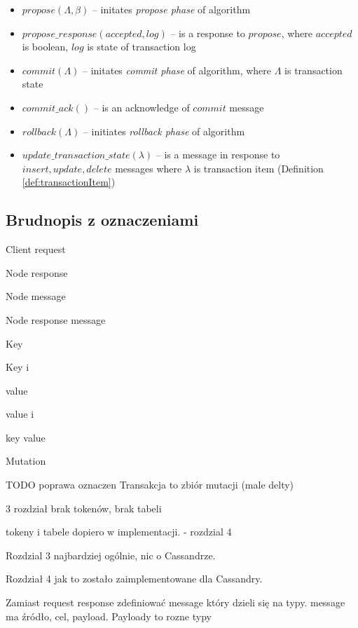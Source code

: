 \begin{definition}
\begin{itemize}
	\item $\mathit{propose}(\Lambda, \beta)$ -- initates \emph{propose phase} of \mpt algorithm
	\item $\mathit{propose\_response}(accepted, log)$ -- is a response to $\mathit{propose}$, where $\mathit{accepted}$ is boolean, $\mathit{log}$ is state of transaction log 
	\item $\mathit{commit}(\Lambda)$ -- initates \emph{commit phase} of \mpt algorithm, where $\Lambda$ is transaction state 
	\item $\mathit{commit\_ack()}$ -- is an acknowledge of $\mathit{commit}$ message 
	\item $\mathit{rollback}(\Lambda)$ -- initiates \emph{rollback phase} of \mpt algorithm
	\item $\mathit{update\_transaction\_state}(\lambda)$ -- is a message in response to $\mathit{insert, update, delete}$ messages where $\lambda$ is transaction item (Definition \ref{def:transactionItem}) 
	\end{itemize}
\end{definition}

\subsection{Brudnopis z oznaczeniami}

Client request 

Node response 

Node message 

Node response message 

Key \key

Key i 

value \kvalue

value i 

key value \kv

Mutation 

TODO poprawa oznaczen
Transakcja to zbiór mutacji (male delty)

3 rozdział brak tokenów, brak tabeli

tokeny i tabele dopiero w implementacji.  - rozdzial 4

Rozdzial 3 najbardziej ogólnie, nic o Cassandrze.

Rozdział 4 jak to zostało zaimplementowane dla Cassandry.

Zamiast request response zdefiniować message który dzieli się na typy.
message ma źródło, cel, payload. Payloady to rozne typy

